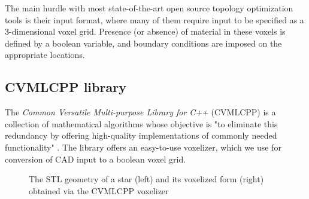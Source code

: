 

The main hurdle with most state-of-the-art open source topology optimization tools is their input format, where many of them require input to be specified as a 3-dimensional voxel grid. Presence (or absence) of material in these voxels is defined by a boolean variable, and boundary conditions are imposed on the appropriate locations. %

\subsection{CVMLCPP library}
The \emph{Common Versatile Multi-purpose Library for C++} (CVMLCPP) is a collection of mathematical algorithms whose objective is "to eliminate this redundancy by offering high-quality implementations of commonly needed functionality" \cite{CVMLCPP}. The library offers an easy-to-use voxelizer, which we use for conversion of CAD input to a boolean voxel grid.

\begin{figure}
\centering
\begin{subfigure}{
  \texttt{[image: Pictures/STLToVoxels/Star\_STL.png]}}
\end{subfigure}
\begin{subfigure}{
  \texttt{[image: Pictures/STLToVoxels/Star\_VTK\_Trans.png]}}
\end{subfigure}
\caption{The STL geometry of a star (left) and its voxelized form (right) obtained via the CVMLCPP voxelizer}
\label{fig: voxelizerStar}
\end{figure}


